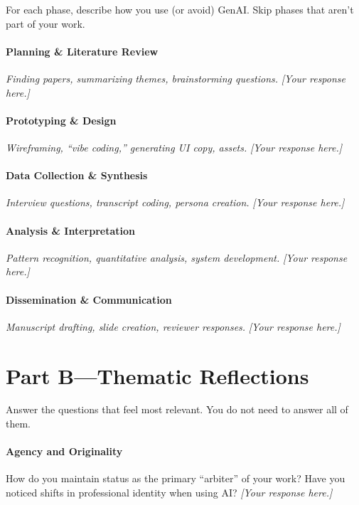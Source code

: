 \documentclass[sigconf]{acmart}
\newcommand{\prompt}[1]{\vspace{0.5em}\noindent\textcolor{workshopaccent}{\small\sffamily #1}\vspace{0.3em}}
\newcommand{\response}{\vspace{0.3em}\noindent\textit{[Your response here.]}\vspace{0.5em}}
\newcommand{\phaseicon}[1]{\textcolor{workshopaccent}{#1}\enspace}
\begin{document}
\prompt{For each phase, describe how you use (or avoid) GenAI.
Skip phases that aren't part of your work.}

\paragraph{\phaseicon{\faSearch} Planning \& Literature Review}
\textit{\small Finding papers, summarizing themes, brainstorming questions.}
\response

\paragraph{\phaseicon{\faPencilRuler} Prototyping \& Design}
\textit{\small Wireframing, ``vibe coding,'' generating UI copy, assets.}
\response

\paragraph{\phaseicon{\faDatabase} Data Collection \& Synthesis}
\textit{\small Interview questions, transcript coding, persona creation.}
\response

\paragraph{\phaseicon{\faChartBar} Analysis \& Interpretation}
\textit{\small Pattern recognition, quantitative analysis, system development.}
\response

\paragraph{\phaseicon{\faBullhorn} Dissemination \& Communication}
\textit{\small Manuscript drafting, slide creation, reviewer responses.}
\response

\section*{Part B\enspace—\enspace Thematic Reflections}

\prompt{Answer the questions that feel most relevant.
You do not need to answer all of them.}

\paragraph{\phaseicon{\faUserShield} Agency and Originality}
How do you maintain status as the primary ``arbiter'' of your work?
Have you noticed shifts in professional identity when using AI?
\response
\end{document}
